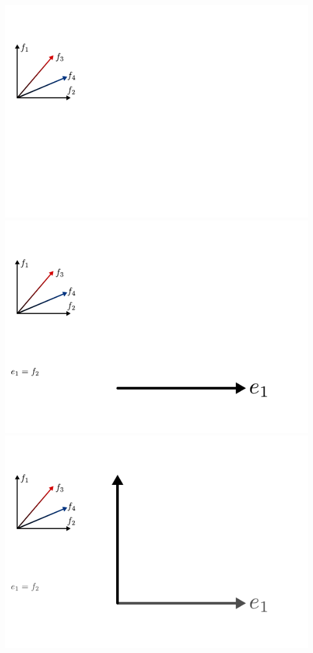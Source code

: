 \documentclass[compress]{beamer}
\begin{document}
\begin{frame}
\begin{center}
\begin{overprint}
      \includegraphics[scale=1.0]{../img/recursionformula/04.pdf}
      \includegraphics[scale=1.0]{../img/recursionformula/05.pdf}
      \includegraphics[scale=1.0]{../img/recursionformula/06.pdf}

\end{overprint}
\end{center}
\end{frame}
\end{document}
